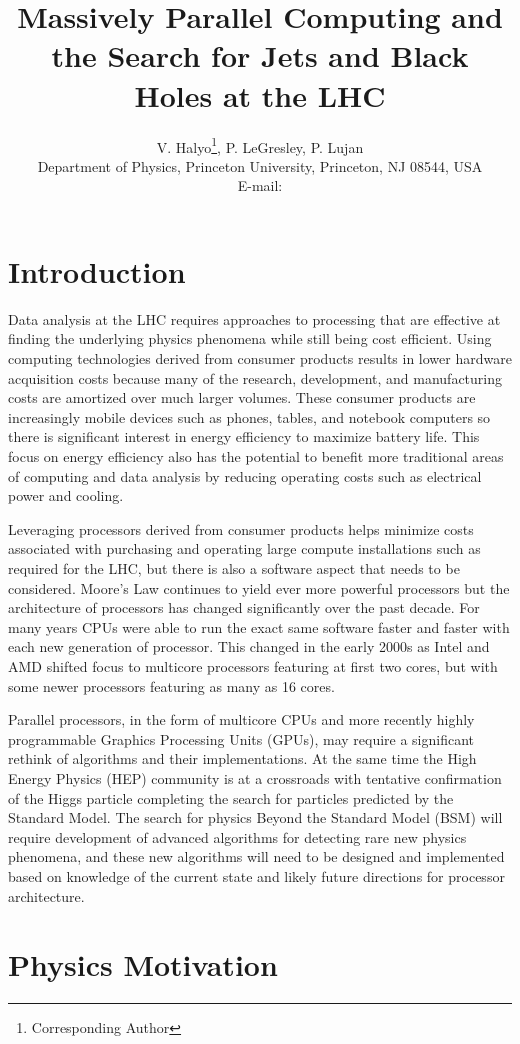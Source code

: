 \documentclass{JINST}
\title{Massively Parallel Computing and the Search for Jets and Black Holes at the LHC}
\author{V. Halyo\thanks{Corresponding Author}, P. LeGresley, P. Lujan \\
\llap Department of Physics, Princeton University, Princeton, NJ 08544, USA \\
E-mail: \email{vhalyo@gmail.com}}
\begin{document}
\section{Introduction} 

Data analysis at the LHC requires approaches to processing that are effective at finding the underlying physics phenomena while still being cost efficient.  Using computing technologies derived from consumer products results in lower hardware acquisition costs because many of the research, development, and manufacturing costs are amortized over much larger volumes.  These consumer products are increasingly mobile devices such as phones, tables, and notebook computers so there is significant interest in energy efficiency to maximize battery life.  This focus on energy efficiency also has the potential to benefit more traditional areas of computing and data analysis by reducing operating costs such as electrical power and cooling.

Leveraging processors derived from consumer products helps minimize costs associated with purchasing and operating large compute installations such as required for the LHC, but there is also a software aspect that needs to be considered.  Moore's Law continues to yield ever more powerful processors but the architecture of processors has changed significantly over the past decade.  For many years CPUs were able to run the exact same software faster and faster with each new generation of processor.  This changed in the early 2000s as Intel and AMD shifted focus to multicore processors featuring at first two cores, but with some newer processors featuring as many as 16 cores.

Parallel processors, in the form of multicore CPUs and more recently highly programmable Graphics Processing Units (GPUs), may require a significant rethink of algorithms and their implementations.  At the same time the High Energy Physics (HEP) community is at a crossroads with tentative confirmation of the Higgs particle completing the search for particles predicted by the Standard Model.  The search for physics Beyond the Standard Model (BSM) will require development of advanced algorithms for detecting rare new physics phenomena, and these new algorithms will need to be designed and implemented based on knowledge of the current state and likely future directions for processor architecture.

\section{Physics Motivation}
\end{document}
